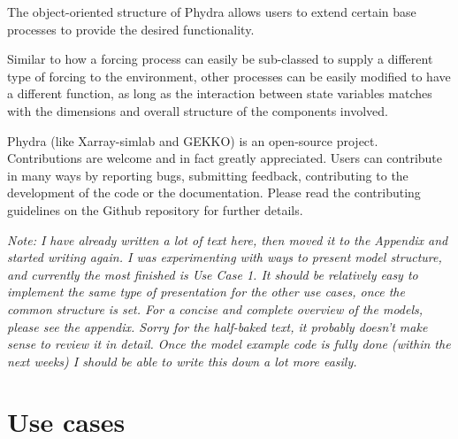 \documentclass[journal abbreviations, manuscript]{copernicus}
\begin{document}
The object-oriented structure of Phydra allows users to extend certain base processes to provide the desired functionality. 

Similar to how a forcing process can easily be sub-classed to supply a different type of forcing to the environment, other processes can be easily modified to have a different function, as long as the interaction between state variables matches with the dimensions and overall structure of the components involved. 

Phydra (like Xarray-simlab and GEKKO) is an open-source project. Contributions are welcome and in fact greatly appreciated. Users can contribute in many ways by reporting bugs, submitting feedback, contributing to the development of the code or the documentation. Please read the contributing guidelines on the Github repository for further details.







\clearpage



\textit{Note: I have already written a lot of text here, then moved it to the Appendix and started writing again. I was experimenting with ways to present model structure, and currently the most finished is Use Case 1. It should be relatively easy to implement the same type of presentation for the other use cases, once the common structure is set. For a concise and complete overview of the models, please see the appendix. Sorry for the half-baked text, it probably doesn't make sense to review it in detail. Once the model example code is fully done (within the next weeks) I should be able to write this down a lot more easily.}

\section{Use cases} \label{Section:UseCases}


% 


\end{document}
